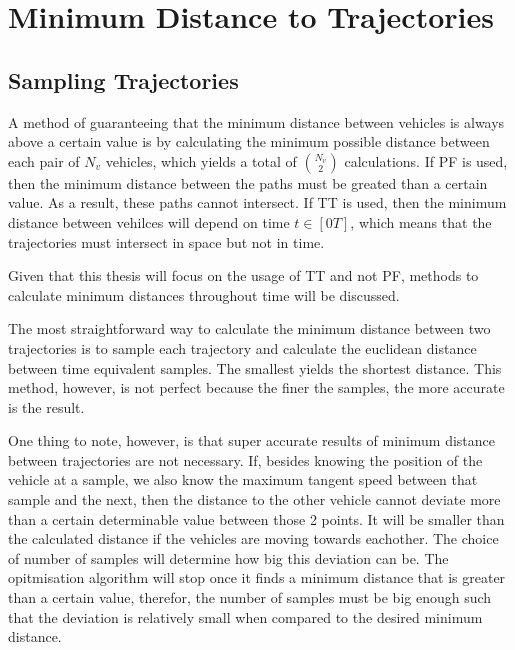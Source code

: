 \section{Minimum Distance to Trajectories}

\subsection{Sampling Trajectories}
\par A method of guaranteeing that the minimum distance between vehicles is always above a certain value is by calculating the minimum possible distance between each pair of $N_v$ vehicles, which yields a total of ${N_v \choose 2}$ calculations. If \ac{PF} is used, then the minimum distance between the paths must be greated than a certain value. As a result, these paths cannot intersect. If \ac{TT} is used, then the minimum distance between vehilces will depend on time $t \in [0 T]$, which means that the trajectories must intersect in space but not in time. 
\par Given that this thesis will focus on the usage of \ac{TT} and not \ac{PF}, methods to calculate minimum distances throughout time will be discussed.
\par The most straightforward way to calculate the minimum distance between two trajectories is to sample each trajectory and calculate the euclidean distance between time equivalent samples. The smallest yields the shortest distance. This method, however, is not perfect because the finer the samples, the more accurate is the result. 
\par One thing to note, however, is that super accurate results of minimum distance between trajectories are not necessary. If, besides knowing the position of the vehicle at a sample, we also know the maximum tangent speed between that sample and the next, then the distance to the other vehicle cannot deviate more than a certain determinable value between those 2 points. It will be smaller than the calculated distance if the vehicles are moving towards eachother. The choice of number of samples will determine how big this deviation can be. The opitmisation algorithm will stop once it finds a minimum distance that is greater than a certain value, therefor, the number of samples must be big enough such that the deviation is relatively small when compared to the desired minimum distance. 
